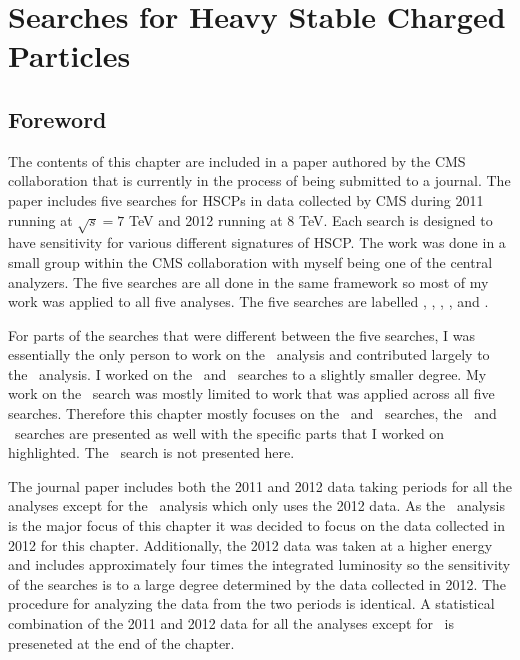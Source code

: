 \chapter{Searches for Heavy Stable Charged Particles \label{sec:search}}

\section{Foreword}
The contents of this chapter are included in a paper authored by the CMS collaboration that is currently in the process of being submitted to a journal. 
The paper includes five searches for HSCPs in data collected by CMS during 2011 running at $\sqrt{s}=7$ TeV and 2012 running at 8 TeV.
Each search is designed to have sensitivity for various different signatures of HSCP. 
The work was done in a small group within the CMS collaboration
with myself being one of the central analyzers. The five searches are all done in the same framework
so most of my work was applied to all five analyses. The five searches are labelled \muononly, \tktof, \tkonly, \multi, and \fract. 

For parts of the searches that were different between the five searches,
I was essentially the only person to work on the \muononly\ analysis and contributed largely to the \tktof\ analysis.
I worked on the \tkonly\ and \multi\ searches to a slightly smaller degree. My work on the \fract\ search was mostly limited to work that was applied across all five searches. 
Therefore this chapter mostly focuses on the \muononly\ and \tktof\ searches, the \tkonly\ and \multi\ searches are presented as well
with the specific parts that I worked on highlighted. The \fract\ search is not presented here.

The journal paper includes both the 2011 and 2012 data taking periods for all the analyses except for the \muononly\ analysis which only uses the 2012 data. 
As the \muononly\ analysis is the major focus of this chapter it was decided to focus on the data collected in 2012 for this chapter.
Additionally, the 2012 data was taken at a higher energy and includes approximately four times the integrated luminosity so the sensitivity of the searches
is to a large degree determined by the data collected in 2012.
The procedure for analyzing the data from the two periods is identical.
A statistical combination of the 2011 and 2012 data for all the analyses except for \muononly\ is preseneted at the end of the chapter. 

